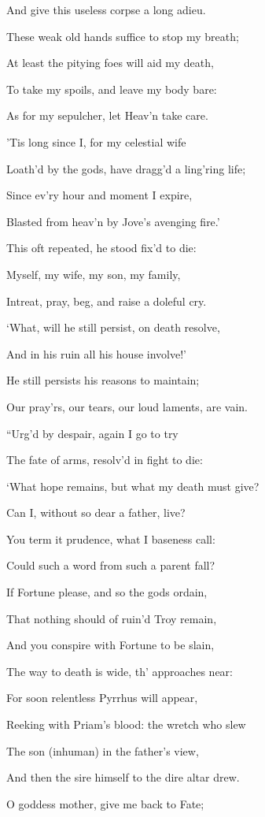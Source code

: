 And give this useless corpse a long adieu.

These weak old hands suffice to stop my breath;

At least the pitying foes will aid my death,

To take my spoils, and leave my body bare:

As for my sepulcher, let Heav’n take care.

’Tis long since I, for my celestial wife

Loath’d by the gods, have dragg’d a ling’ring life;

Since ev’ry hour and moment I expire,

Blasted from heav’n by Jove’s avenging fire.’

This oft repeated, he stood fix’d to die:

Myself, my wife, my son, my family,

Intreat, pray, beg, and raise a doleful cry.

‘What, will he still persist, on death resolve,

And in his ruin all his house involve!’

He still persists his reasons to maintain;

Our pray’rs, our tears, our loud laments, are vain.

“Urg’d by despair, again I go to try

The fate of arms, resolv’d in fight to die:

‘What hope remains, but what my death must give?

Can I, without so dear a father, live?

You term it prudence, what I baseness call:

Could such a word from such a parent fall?

If Fortune please, and so the gods ordain,

That nothing should of ruin’d Troy remain,

And you conspire with Fortune to be slain,

The way to death is wide, th’ approaches near:

For soon relentless Pyrrhus will appear,

Reeking with Priam’s blood: the wretch who slew

The son (inhuman) in the father’s view,

And then the sire himself to the dire altar drew.

O goddess mother, give me back to Fate;

